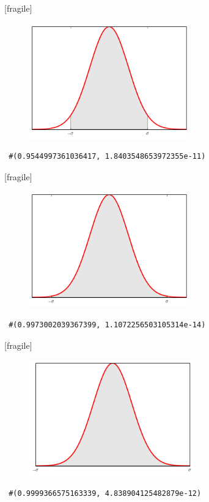 [fragile]
 \begin{figure}[h]
 \centering
 \includegraphics[height=5cm,keepaspectratio=true]{./pe/norm2.png}
 \label{fig:norm2}
\end{figure}
\begin{verbatim}
 #(0.9544997361036417, 1.8403548653972355e-11)
\end{verbatim}


[fragile]
 \begin{figure}[h]
 \centering
 \includegraphics[height=5cm,keepaspectratio=true]{./pe/norm3.png}
 \label{fig:norm3}
\end{figure}
\begin{verbatim}
 #(0.9973002039367399, 1.1072256503105314e-14)
\end{verbatim}


[fragile]
 \begin{figure}[h]
 \centering
 \includegraphics[height=5cm,keepaspectratio=true]{./pe/norm4.png}
 \label{fig:norm4}
\end{figure}
\begin{verbatim}
 #(0.9999366575163339, 4.838904125482879e-12)
\end{verbatim}


